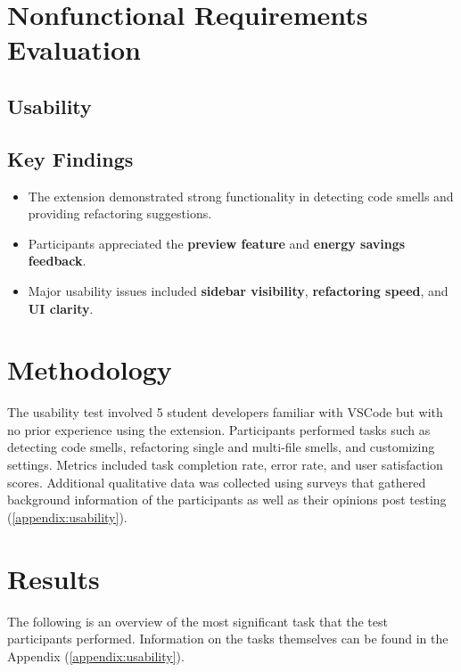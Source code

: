 \documentclass[12pt, titlepage]{article}
\begin{document}
\section{Nonfunctional Requirements Evaluation}

\subsection{Usability}

\subsection*{Key Findings}
\begin{itemize}
  \item The extension demonstrated strong functionality in detecting
    code smells and providing refactoring suggestions.
  \item Participants appreciated the \textbf{preview feature} and
    \textbf{energy savings feedback}.
  \item Major usability issues included \textbf{sidebar visibility},
    \textbf{refactoring speed}, and \textbf{UI clarity}.
\end{itemize}

\section*{Methodology}
The usability test involved 5 student developers familiar with VSCode
but with no prior experience using the extension. Participants
performed tasks such as detecting code smells, refactoring single and
multi-file smells, and customizing settings. Metrics included task
completion rate, error rate, and user satisfaction scores. Additional
qualitative data was collected using surveys that gathered background
information of the participants as well as their opinions post
testing (\ref{appendix:usability}).

\section*{Results}

The following is an overview of the most significant task that the
test participants performed. Information on the tasks themselves can
be found in the Appendix (\ref{appendix:usability}).
\end{document}
